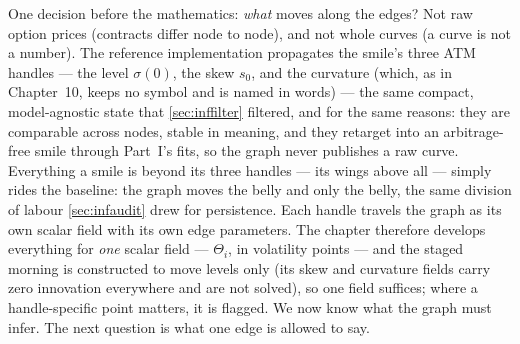 One decision before the mathematics: \emph{what} moves along the
edges?  Not raw option prices (contracts differ node to node), and not
whole curves (a curve is not a number).  The reference implementation
propagates the smile's three ATM handles --- the level $\sigma(0)$, the
skew $s_0$, and the curvature (which, as in Chapter~10, keeps no
symbol and is named in words) --- the same compact, model-agnostic
state that \cref{sec:inffilter} filtered, and for the same reasons:
they are comparable across nodes, stable in meaning, and they retarget
into an arbitrage-free smile through Part~I's fits, so the
graph never publishes a raw curve.  Everything a smile is beyond its
three handles --- its wings above all --- simply rides the baseline:
the graph moves the belly and only the belly, the same division of
labour \cref{sec:infaudit} drew for persistence.  Each handle travels
the graph as its own scalar field with its own edge parameters.  The
chapter therefore develops everything for \emph{one} scalar field ---
$\Theta_i$, in volatility points --- and the staged morning is
constructed to move levels only (its skew and curvature fields carry
zero innovation everywhere and are not solved), so one field
suffices; where a handle-specific point matters, it is
flagged.  We now know
what the graph must infer.  The next question is what one edge is
allowed to say.
